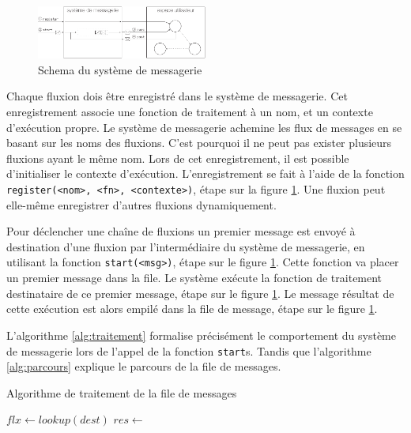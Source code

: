 \begin{figure}[h!]
  \includegraphics[width=0.5\textwidth]{schema-message.pdf}
  \caption{Schema du système de messagerie}
  \label{fig:messagerie}
\end{figure}

Chaque fluxion dois être enregistré dans le système de messagerie.
Cet enregistrement associe une fonction de traitement à un nom, et un contexte d'exécution propre.
Le système de messagerie achemine les flux de messages en se basant sur les noms des fluxions.
C'est pourquoi il ne peut pas exister plusieurs fluxions ayant le même nom.
Lors de cet enregistrement, il est possible d'initialiser le contexte d'exécution.
L'enregistrement se fait à l'aide de la fonction \texttt{register(<nom>, <fn>, <contexte>)}, étape  sur la figure \ref{fig:messagerie}.
Une fluxion peut elle-même enregistrer d'autres fluxions dynamiquement.

Pour déclencher une chaîne de fluxions un premier message est envoyé à destination d'une fluxion par l'intermédiaire du système de messagerie, en utilisant la fonction \texttt{start(<msg>)}, étape  sur le figure \ref{fig:messagerie}.
Cette fonction va placer un premier message dans la file.
Le système exécute la fonction de traitement destinataire de ce premier message, étape  sur le figure \ref{fig:messagerie}.
Le message résultat de cette exécution est alors empilé dans la file de message, étape  sur le figure \ref{fig:messagerie}.

L'algorithme \ref{alg:traitement} formalise précisément le comportement du système de messagerie lors de l'appel de la fonction \texttt{start}s.
Tandis que l'algorithme \ref{alg:parcours} explique le parcours de la file de messages.

\begin{algorithm}
\caption{Algorithme de traitement de la file de messages}
\label{alg:traitement}
\begin{algorithmic}
\State $flx \gets lookup(dest)$
\State $res \gets$  
\State {} 
\EndFor
\EndFunction
\end{algorithmic}
\end{algorithm}

